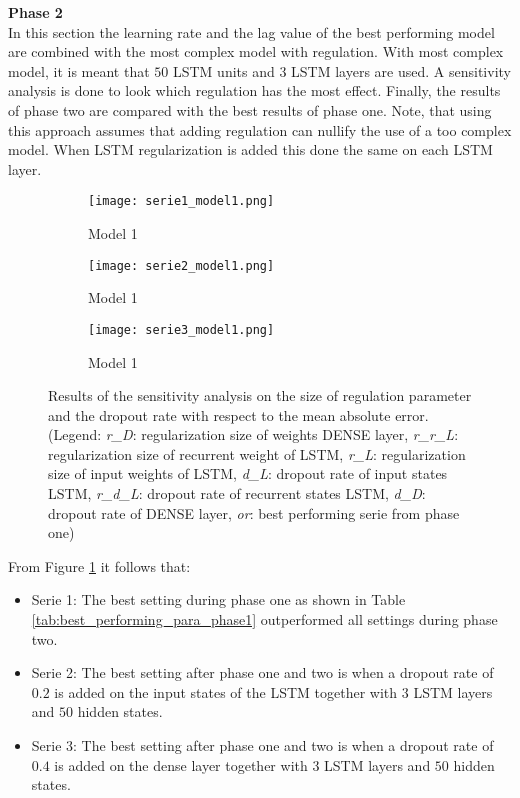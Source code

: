 \textbf{Phase 2}\\
In this section the learning rate and the lag value of the best performing model are combined with the most complex model with regulation. With most complex model, it is meant that $ 50 $ LSTM units and $ 3 $ LSTM layers are used. A sensitivity analysis is done to look which regulation has the most effect. Finally, the results of phase two are compared with the best results of phase one. Note, that using this approach assumes that adding regulation can nullify the use of a too complex model. When LSTM regularization is added this done the same on each LSTM layer.


\begin{figure}[h!]
	\centering
	\begin{subfigure}{0.49\linewidth}
		\texttt{[image: serie1\_model1.png]}
		\caption{Model 1}
	\end{subfigure}	
	\begin{subfigure}{0.49\linewidth}
		\texttt{[image: serie2\_model1.png]}
		\caption{Model 1}
	\end{subfigure}
\begin{subfigure}{0.5\linewidth}
	\texttt{[image: serie3\_model1.png]}
	\caption{Model 1}
\end{subfigure}
	\caption{Results of the sensitivity analysis on the size of regulation parameter and the dropout rate with respect to the mean absolute error.(Legend: \textit{r\_D}: regularization size of weights DENSE layer,  \textit{r\_r\_L}: regularization size of recurrent weight of LSTM, \textit{r\_L}: regularization size of input weights of LSTM, \textit{d\_L}: dropout rate of input states LSTM, \textit{r\_d\_L}: dropout rate of recurrent states LSTM, \textit{d\_D}: dropout rate of DENSE layer, \textit{or}: best performing serie from phase one)}
	\label{fig:sensitivity_model1}
\end{figure}

From Figure \ref{fig:sensitivity_model1} it follows that:
\begin{itemize}
	\item Serie 1: The best setting during phase one as shown in Table \ref{tab:best_performing_para_phase1} outperformed all settings during phase two. 
	\item Serie 2: The best setting after phase one and two is when a dropout rate of $ 0.2 $ is added on the input states of the LSTM together with $ 3 $ LSTM layers and $ 50 $ hidden states.
	\item Serie 3: The best setting after phase one and two is when a dropout rate of $ 0.4 $ is added on the dense layer together with $ 3 $ LSTM layers and $ 50 $ hidden states.
\end{itemize}


